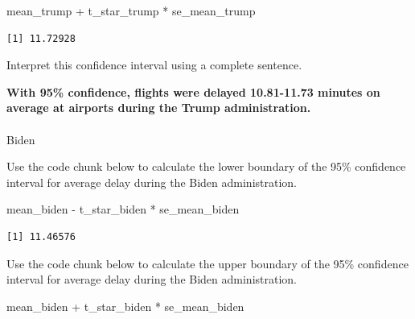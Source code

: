 \documentclass[
  letterpaper,
  DIV=11,
  numbers=noendperiod]{scrartcl}
\makeatletter
\let\oldparagraph\paragraph
\renewcommand{\paragraph}{
    \@ifstar
      \xxxParagraphStar
      \xxxParagraphNoStar
  }
\newcommand{\xxxParagraphStar}[1]{\oldparagraph*{#1}\mbox{}}
\newcommand{\xxxParagraphNoStar}[1]{\oldparagraph{#1}\mbox{}}
\newenvironment{Shaded}{\begin{snugshade}}{\end{snugshade}}
\newcommand{\NormalTok}[1]{\textcolor[rgb]{0.00,0.23,0.31}{#1}}
\newcommand{\SpecialCharTok}[1]{\textcolor[rgb]{0.37,0.37,0.37}{#1}}
\makeatother
\begin{document}
\begin{Shaded}
\begin{Highlighting}[]
\NormalTok{mean\_trump }\SpecialCharTok{+}\NormalTok{ t\_star\_trump }\SpecialCharTok{*}\NormalTok{ se\_mean\_trump}
\end{Highlighting}
\end{Shaded}

\begin{verbatim}
[1] 11.72928
\end{verbatim}

Interpret this confidence interval using a complete sentence.

\begin{tcolorbox}[enhanced jigsaw, toprule=.15mm, breakable, leftrule=.75mm, bottomrule=.15mm, rightrule=.15mm, colback=white, opacityback=0, colframe=quarto-callout-warning-color-frame, left=2mm, arc=.35mm]

\textbf{With 95\% confidence, flights were delayed 10.81-11.73 minutes
on average at airports during the Trump administration.}

\end{tcolorbox}

\paragraph{Biden}\label{biden-1}

Use the code chunk below to calculate the lower boundary of the 95\%
confidence interval for average delay during the Biden administration.

\begin{Shaded}
\begin{Highlighting}[]
\NormalTok{mean\_biden }\SpecialCharTok{{-}}\NormalTok{ t\_star\_biden }\SpecialCharTok{*}\NormalTok{ se\_mean\_biden}
\end{Highlighting}
\end{Shaded}

\begin{verbatim}
[1] 11.46576
\end{verbatim}

Use the code chunk below to calculate the upper boundary of the 95\%
confidence interval for average delay during the Biden administration.

\begin{Shaded}
\begin{Highlighting}[]
\NormalTok{mean\_biden }\SpecialCharTok{+}\NormalTok{ t\_star\_biden }\SpecialCharTok{*}\NormalTok{ se\_mean\_biden}
\end{Highlighting}
\end{Shaded}
\end{document}

